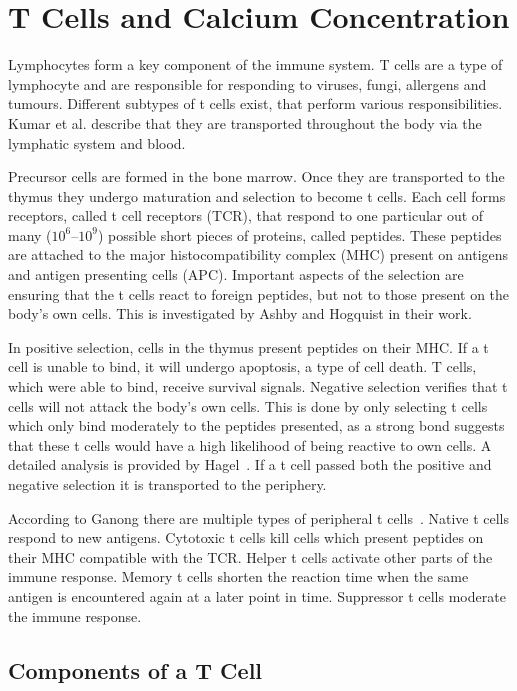 \chapter{T Cells and Calcium Concentration}
\label{chapter:t-cell}

Lymphocytes form a key component of the immune system. T cells are a type of lymphocyte and are responsible for responding to viruses, fungi, allergens and tumours. Different subtypes of t cells exist, that perform various responsibilities. Kumar et al. describe that they are transported throughout the body via the lymphatic system and blood.\cite{Kumar2018}

Precursor cells are formed in the bone marrow. Once they are transported to the thymus they undergo maturation and selection to become t cells. Each cell forms receptors, called t cell receptors (TCR), that respond to one particular out of many ($10^6 – 10^9$) possible short pieces of proteins, called peptides. These peptides are attached to the major histocompatibility complex (MHC) present on antigens and antigen presenting cells (APC). Important aspects of the selection are ensuring that the t cells react to foreign peptides, but not to those present on the body's own cells. This is investigated by Ashby and Hogquist in their work\cite{Ashby2024}.

In positive selection, cells in the thymus present peptides on their MHC. If a t cell is unable to bind, it will undergo apoptosis, a type of cell death. T cells, which were able to bind, receive survival signals. Negative selection verifies that t cells will not attack the body's own cells. This is done by only selecting t cells which only bind moderately to the peptides presented, as a strong bond suggests that these t cells would have a high likelihood of being reactive to own cells. A detailed analysis is provided by Hagel~\cite{Hagel2018}. If a t cell passed both the positive and negative selection it is transported to the periphery.

According to Ganong there are multiple types of peripheral t cells~\cite{Ganong1997}. Native t cells respond to new antigens. Cytotoxic t cells kill cells which present peptides on their MHC compatible with the TCR. Helper t cells activate other parts of the immune response. Memory t cells shorten the reaction time when the same antigen is encountered again at a later point in time. Suppressor t cells moderate the immune response.

\section{Components of a T Cell}


